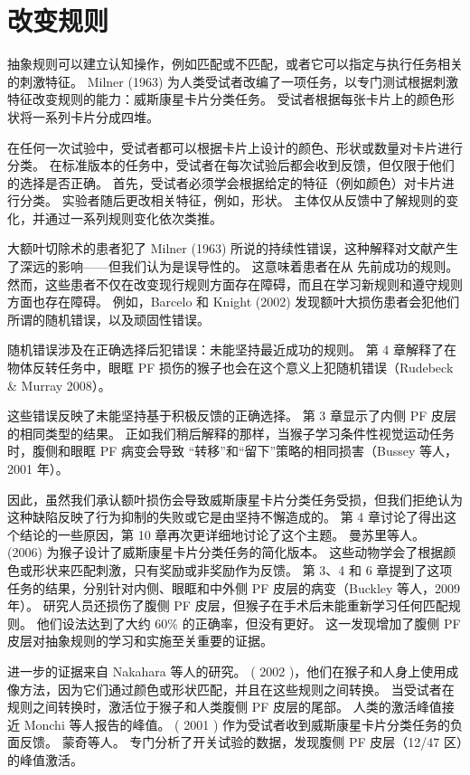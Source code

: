 \section{改变规则}
\par
抽象规则可以建立认知操作，例如匹配或不匹配，或者它可以指定与执行任务相关的刺激特征。 Milner (1963) 为人类受试者改编了一项任务，以专门测试根据刺激特征改变规则的能力：威斯康星卡片分类任务。 受试者根据每张卡片上的颜色形状将一系列卡片分成四堆。
\par
在任何一次试验中，受试者都可以根据卡片上设计的颜色、形状或数量对卡片进行分类。 在标准版本的任务中，受试者在每次试验后都会收到反馈，但仅限于他们的选择是否正确。 首先，受试者必须学会根据给定的特征（例如颜色）对卡片进行分类。 实验者随后更改相关特征，例如，形状。 主体仅从反馈中了解规则的变化，并通过一系列规则变化依次类推。
\par
大额叶切除术的患者犯了 Milner (1963) 所说的持续性错误，这种解释对文献产生了深远的影响——但我们认为是误导性的。 这意味着患者在从
先前成功的规则。 然而，这些患者不仅在改变现行规则方面存在障碍，而且在学习新规则和遵守规则方面也存在障碍。 例如，Barcelo 和 Knight (2002) 发现额叶大损伤患者会犯他们所谓的随机错误，以及顽固性错误。
\par
随机错误涉及在正确选择后犯错误：未能坚持最近成功的规则。 第 4 章解释了在物体反转任务中，眼眶 PF 损伤的猴子也会在这个意义上犯随机错误（Rudebeck & Murray 2008）。
\par
这些错误反映了未能坚持基于积极反馈的正确选择。 第 3 章显示了内侧 PF 皮层的相同类型的结果。 正如我们稍后解释的那样，当猴子学习条件性视觉运动任务时，腹侧和眼眶 PF 病变会导致
“转移”和“留下”策略的相同损害（Bussey 等人，2001 年）。
\par
因此，虽然我们承认额叶损伤会导致威斯康星卡片分类任务受损，但我们拒绝认为这种缺陷反映了行为抑制的失败或它是由坚持不懈造成的。 第 4 章讨论了得出这个结论的一些原因，第 10 章再次更详细地讨论了这个主题。 曼苏里等人。 (2006) 为猴子设计了威斯康星卡片分类任务的简化版本。 这些动物学会了根据颜色或形状来匹配刺激，只有奖励或非奖励作为反馈。 第 3、4 和 6 章提到了这项任务的结果，分别针对内侧、眼眶和中外侧 PF 皮层的病变（Buckley 等人，2009 年）。 研究人员还损伤了腹侧 PF 皮层，但猴子在手术后未能重新学习任何匹配规则。 他们设法达到了大约 60\% 的正确率，但没有更好。 这一发现增加了腹侧 PF 皮层对抽象规则的学习和实施至关重要的证据。
\par
进一步的证据来自 Nakahara 等人的研究。 ( 2002 )，他们在猴子和人身上使用成像方法，因为它们通过颜色或形状匹配，并且在这些规则之间转换。 当受试者在规则之间转换时，激活位于猴子和人类腹侧 PF 皮层的尾部。 人类的激活峰值接近 Monchi 等人报告的峰值。 ( 2001 ) 作为受试者收到威斯康星卡片分类任务的负面反馈。 蒙奇等人。 专门分析了开关试验的数据，发现腹侧 PF 皮层（12/47 区）的峰值激活。

